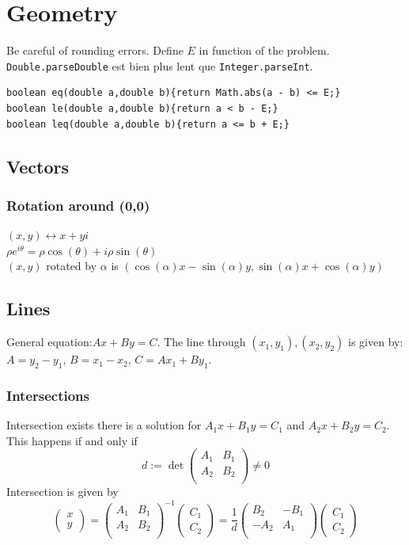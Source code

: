 \section{Geometry}
Be careful of rounding errors. Define $E$ in function of the problem.
\lstinline|Double.parseDouble| est bien plus lent que \lstinline|Integer.parseInt|.
\begin{lstlisting}
boolean eq(double a,double b){return Math.abs(a - b) <= E;}
boolean le(double a,double b){return a < b - E;}
boolean leq(double a,double b){return a <= b + E;}
\end{lstlisting}
\subsection{Vectors}
\subsubsection{Rotation around (0,0)}
$(x, y) \leftrightarrow x + y i$\\
$\rho e^{i\theta} = \rho \cos(\theta) + i \rho \sin(\theta)$\\

$(x, y)$ rotated by $\alpha$ is
$(\cos(\alpha) x - \sin(\alpha) y, \sin(\alpha)  x + \cos(\alpha) y)$


\subsection{Lines}
General equation:$Ax + By = C$. The line through $(x_1, y_1), (x_2, y_2)$ is given by: $A = y_2 - y_1$, $B = x_1 - x_2$, $C = A x_1 + B y_1$.
\subsubsection{Intersections}
Intersection exists there is a solution for $A_1 x + B_1 y = C_1$ and $A_2 x + B_2 y = C_2$. This happens if and only if $$d := \det \begin{pmatrix}
A_1 & B_1 \\
A_2 & B_2 \\
\end{pmatrix} \neq 0$$
Intersection is given by
$$\begin{pmatrix}
x\\
y
\end{pmatrix} = 
\begin{pmatrix}
A_1 & B_1 \\
A_2 & B_2 \\
\end{pmatrix}^{-1} 
\begin{pmatrix}
C_1 \\
C_2
\end{pmatrix}
=
\frac{1}{d}
\begin{pmatrix}
B_2 & -B_1 \\
-A_2 & A_1 \\
\end{pmatrix} 
\begin{pmatrix}
C_1 \\
C_2
\end{pmatrix}
$$
